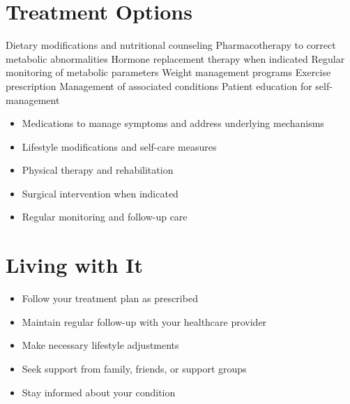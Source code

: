 \section{Treatment Options}
Dietary modifications and nutritional counseling Pharmacotherapy to correct metabolic abnormalities Hormone replacement therapy when indicated Regular monitoring of metabolic parameters Weight management programs Exercise prescription Management of associated conditions Patient education for self-management

\begin{itemize}[noitemsep]
  \item Medications to manage symptoms and address underlying mechanisms
  \item Lifestyle modifications and self-care measures
  \item Physical therapy and rehabilitation
  \item Surgical intervention when indicated
  \item Regular monitoring and follow-up care
\end{itemize}
\section{Living with It}
\begin{itemize}[noitemsep]
  \item Follow your treatment plan as prescribed
  \item Maintain regular follow-up with your healthcare provider
  \item Make necessary lifestyle adjustments
  \item Seek support from family, friends, or support groups
  \item Stay informed about your condition
\end{itemize}
